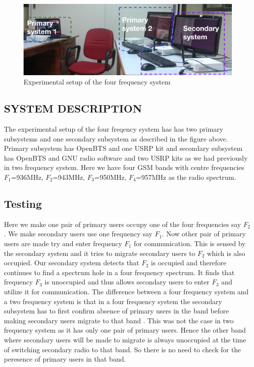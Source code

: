 \begin{figure}
\centering
\includegraphics[width=1\textwidth]{freq4}
\caption[Experimental setup, 4-frequency system]{Experimental setup of the four
 frequency system}
\label{freq4}
\end{figure}

\subsection{SYSTEM DESCRIPTION}
 The experimental setup of the four freqency system has 
has two primary subsystems and one secondary subsystem as described in the figure above. Primary subsystem 
has OpenBTS and one USRP kit and secondary subsystem has OpenBTS and GNU radio 
software and two USRP kits as we had previously in two frequency system. 
Here we have four GSM bands with centre frequencies 
$F_1$=936MHz, $F_2$=943MHz, $F_3$=950MHz, $F_4$=957MHz as the radio spectrum.
 



\subsection{Testing}
Here we make one pair of primary users occupy one of the four frequencies say 
$F_2$. We make secondary users use one frequency say $F_1$. Now other pair of 
primary users are made try and enter frequency $F_1$ for communication. This is sensed by 
the secondary system and it tries to migrate secondary users to $F_2$ which is 
also occupied. Our secondary system detects that $F_2$ is occupied and therefore 
continues to find a spectrum hole in a four frequency spectrum. It finds that 
frequency $F_3$ is unoccupied and thus allows secondary users to enter $F_3$ 
and utilize it for communication. The difference between a four frequency 
system and a two frequency system is that in a four frequency 
system the secondary subsystem has to first confirm absence of primary users 
in the band before making secondary users migrate to that band . This was not
the case in two frequency system as it has only one 
pair of primary users. Hence the other band where secondary users will be made 
to migrate is always unoccupied at the time of switching secondary radio to 
that band. So there is no need to check for the peresence of primary users in that band.

